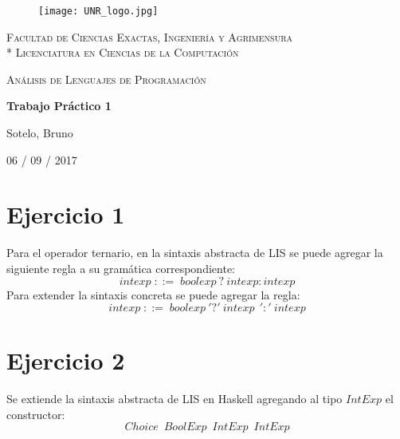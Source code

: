 \documentclass[12pt,a4paper]{article}
\begin{document}
\begin{titlepage}
\centering
\begin{figure}[H]
    \begin{center}
        \texttt{[image: UNR\_logo.jpg]}
    \end{center}
\end{figure}
{\scshape\large Facultad de Ciencias Exactas, Ingenier\'ia y Agrimensura\\*
                 Licenciatura en Ciencias de la Computaci\'on\par}
\vspace{3cm}
{\scshape\LARGE An\'alisis de Lenguajes de Programaci\'on\par}
{\huge\bfseries Trabajo Pr\'actico 1\par}
\vspace{3cm}
{\Large Sotelo, Bruno\par}
\vfill
{\large 06 / 09 / 2017 \par}
\end{titlepage}

\section*{Ejercicio 1}
Para el operador ternario, en la sintaxis abstracta de LIS se puede
agregar la siguiente regla a su gram\'atica correspondiente:
$$ intexp\;::=\;boolexp\:?\:intexp:intexp $$
Para extender la sintaxis concreta se puede agregar la regla:
$$ intexp\;::=\;boolexp\:'?'\:intexp\:\:':'\:intexp $$

\section*{Ejercicio 2}
Se extiende la sintaxis abstracta de LIS en Haskell agregando al
tipo $IntExp$ el constructor:
$$ Choice\;\:BoolExp\;\:IntExp\;\:IntExp $$
\end{document}
